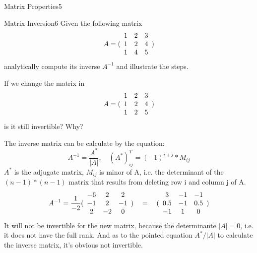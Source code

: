 \begin{questions}
\begin{question}{Matrix Properties}{5}
\begin{answer}
\end{answer}
\end{question}


\begin{question}{Matrix Inversion}{6}
Given the following matrix 
\begin{equation*}
     A = ( \begin{array}{c c c} 
     1 & 2 & 3 \\
     1 & 2 & 4 \\
     1 & 4 & 5 \end{array} )
\end{equation*}
analytically compute its inverse $ A^{-1}$ and illustrate the steps.

If we change the matrix in
\begin{equation*}
     A = ( \begin{array}{c c c} 
     1 & 2 & 3 \\
     1 & 2 & 4 \\
     1 & 2 & 5 \end{array} )
\end{equation*}
is it still invertible? Why?

\begin{answer}
The inverse matrix can be calculate by the equation:
\begin{equation*}
    A^{-1} = \frac{A^{*}}{|A|}, \quad (A^{*})^{T}_{ij} = (-1)^{i+j}*M_{ij}
\end{equation*}
$A^{*}$ is the adjugate matrix, $M_{ij}$ is minor of A, 
i.e. the determinant of the $(n - 1)*(n - 1)$ matrix that results from deleting row i and column j of A.\\ 
\begin{equation*}
    A^{-1} = \frac{1}{-2} ( \begin{array}{c c c} 
    -6 & 2 & 2 \\
    -1 & 2 & -1 \\
    2 & -2 & 0 \end{array} ) \quad = \quad
       ( \begin{array}{c c c} 
        3 & -1 & -1 \\
        0.5 & -1 & 0.5 \\
       -1 & 1 & 0 \end{array} )
\end{equation*}
It will not be invertible for the new matrix, because the determinante $|A| = 0$, i.e. it does not have the full rank.
And as to the pointed equation $A^{*} / |A|$ to calculate the inverse matrix, it's obvious not invertible.
\end{answer}
\end{question}
	

\end{questions}
